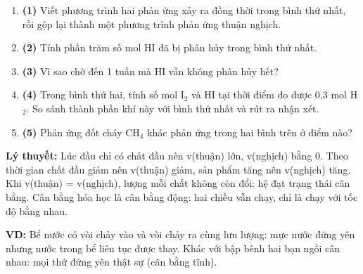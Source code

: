 \qhead
\begin{enumerate}[label={}, leftmargin=0.5em, itemsep=6pt]
\item \textbf{(1)} Viết phương trình hai phản ứng xảy ra đồng thời trong bình thứ nhất, rồi gộp lại thành một phương trình phản ứng thuận nghịch. 
\item \textbf{(2)} Tính phần trăm số mol HI đã bị phân hủy trong bình thứ nhất. 
\item \textbf{(3)} Vì sao chờ đến 1 tuần mà HI vẫn không phân hủy hết? 
\item \textbf{(4)} Trong bình thứ hai, tính số mol I$_{2}$ và HI tại thời điểm đo được 0,3 mol H$_{2}$. So sánh thành phần khí này với bình thứ nhất và rút ra nhận xét. 
\item \textbf{(5)} Phản ứng đốt cháy CH$_{4}$ khác phản ứng trong hai bình trên ở điểm nào? 
\end{enumerate}
\textbf{Lý thuyết:} Lúc đầu chỉ có chất đầu nên v(thuận) lớn, v(nghịch) bằng 0. Theo thời gian chất đầu giảm nên v(thuận) giảm, sản phẩm tăng nên v(nghịch) tăng. Khi v(thuận) = v(nghịch), lượng mỗi chất không còn đổi: hệ đạt trạng thái cân bằng. Cân bằng hóa học là cân bằng động: hai chiều vẫn chạy, chỉ là chạy với tốc độ bằng nhau.

\textbf{VD:} Bể nước có vòi chảy vào và vòi chảy ra cùng lưu lượng: mực nước đứng yên nhưng nước trong bể liên tục được thay. Khác với bập bênh hai bạn ngồi cân nhau: mọi thứ đứng yên thật sự (cân bằng tĩnh).

